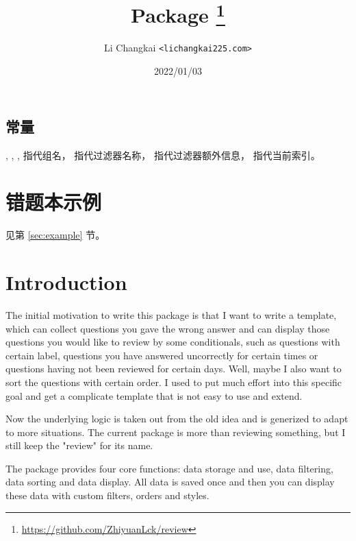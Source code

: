 \documentclass[full]{l3doc}
\begin{document}
\begin{documentation}
\subsection{常量}

\begin{function}{\rvGroup, \rvFilterName, \rvFilterInfo, \rvIndex}
   指代组名， 指代过滤器名称，
  指代过滤器额外信息， 指代当前索引。
\end{function}

\section{错题本示例}
见第 \ref{sec:example} 节。

\title{
  Package 
  \protect\footnote{\url{https://github.com/ZhiyuanLck/review}}
}
\author{Li Changkai \texttt{<lichangkai225\@qq.com>}}
\date{2022/01/03}
\maketitle

\section{Introduction}

The initial motivation to write this package is that I want to write a
template, which can collect questions you gave the wrong answer and can
display those questions you would like to review by some conditionals, such as
questions with certain label, questions you have answered uncorrectly for
certain times or questions having not been reviewed for certain days. Well,
maybe I also want to sort the questions with certain order. I used to put much
effort into this specific goal and get a complicate template that is not easy
to use and extend.

Now the underlying logic is taken out from the old idea and is generized to
adapt to more situations. The current package is more than reviewing something,
but I still keep the "review" for its name.

The package provides four core functions: data storage and use, data filtering,
data sorting and data display. All data is saved once and then you can display
these data with custom filters, orders and styles.


\end{documentation}
\end{document}

